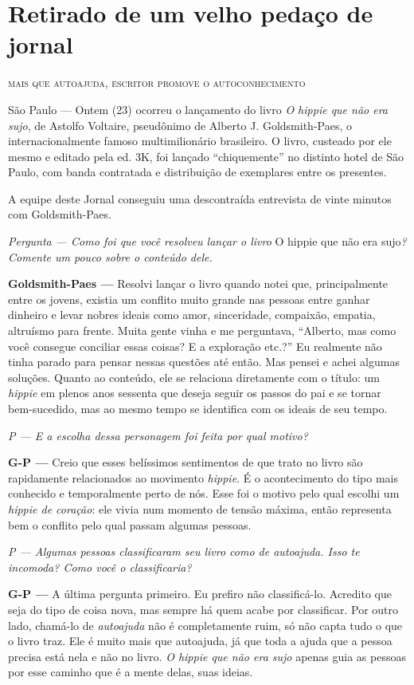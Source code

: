 \chapter{Retirado de um velho pedaço de jornal}

{\Large \textsc{mais que autoajuda, escritor promove o autoconhecimento}}

São Paulo --- Ontem (23) ocorreu o lançamento do livro \emph{O hippie que não era sujo}, de Astolfo Voltaire, pseudônimo de Alberto J. Goldsmith-Paes, o internacionalmente famoso multimilionário brasileiro. O livro, custeado por ele mesmo e editado pela ed. 3K, foi lançado ``chiquemente'' no distinto hotel de São Paulo, com banda contratada e distribuição de exemplares entre os presentes.

A equipe deste Jornal conseguiu uma descontraída entrevista de vinte minutos com Goldsmith-Paes.

\emph{Pergunta --- Como foi que você resolveu lançar o livro} O hippie que não era sujo\emph{? Comente um pouco sobre o conteúdo dele.}

\textbf{Goldsmith-Paes ---} Resolvi lançar o livro quando notei que, principalmente entre os jovens, existia um conflito muito gran\-de nas pessoas entre ganhar dinheiro e levar nobres ideais como amor, sinceridade, compaixão, empatia, altruísmo para frente. Muita gente vinha e me perguntava, ``Alberto, mas como você consegue conciliar essas coisas? E a exploração etc.?'' Eu realmente não tinha parado para pensar nessas questões até então. Mas pensei e achei algumas soluções. Quanto ao conteúdo, ele se relaciona diretamente com o título: um \emph{hippie} em plenos anos sessenta que deseja seguir os passos do pai e se tornar bem-sucedido, mas ao mesmo tempo se identifica com os ideais de seu tempo.

\emph{P --- E a escolha dessa personagem foi feita por qual motivo?}

\textbf{G-P ---} Creio que esses belíssimos sentimentos de que trato no livro são rapidamente relacionados ao movimento \emph{hippie}. É o acontecimento do tipo mais conhecido e temporalmente perto de nós. Esse foi o motivo pelo qual escolhi um \emph{hippie de coração}: ele vivia num momento de tensão máxima, então representa bem o conflito pelo qual passam algumas pessoas.

\emph{P --- Algumas pessoas classificaram seu livro como de \emph{autoajuda}. Isso te incomoda? Como você o classificaria?}

\textbf{G-P ---} A última pergunta primeiro. Eu prefiro não clas\-si\-ficá-lo. Acredito que seja do tipo de coisa nova, mas sempre há quem acabe por classificar. Por outro lado, chamá-lo de \emph{autoajuda} não é completamente ruim, só não capta tudo o que o livro traz. Ele é muito mais que autoajuda, já que toda a ajuda que a pessoa precisa está nela e não no livro. \emph{O hippie que não era sujo} apenas guia as pessoas por esse caminho que é a mente delas, suas ideias.

